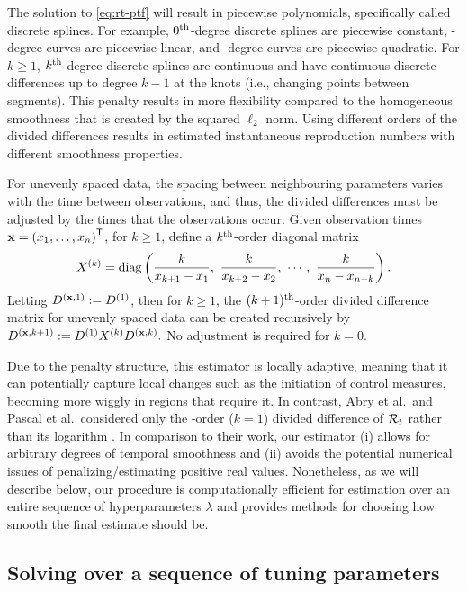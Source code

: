 The solution to \eqref{eq:rt-ptf} will result in piecewise
polynomials, specifically called discrete splines. For example, $0^{\textnormal{th}}$-degree
discrete splines are piecewise constant, \first-degree curves are piecewise
linear, and \second-degree curves are piecewise quadratic. For $k\geq 1$,
$k^{\textnormal{th}}$-degree discrete splines are continuous and have continuous discrete
differences up to degree $k-1$ at the knots (i.e., changing points between segments). This penalty results in more
flexibility compared to the homogeneous smoothness that is created by the
squared $\ell_2$ norm. Using different orders of the divided differences results in
estimated instantaneous reproduction numbers with different smoothness properties. 



For unevenly spaced data, the spacing between neighbouring parameters
varies with the time between observations, and thus, the divided differences
must be adjusted by the times that the observations occur. Given observation
times $\mathbf{x} = {(x_1,\dots,x_n)}^{\mathsf{T}}$, for $k \geq 1$, define a $k^{\textnormal{th}}$-order
diagonal matrix 
\begin{equation}
  X^{(k)} = \diag \lr{\frac{k}{x_{k+1} - x_1},\ \frac{k}{x_{k+2} - x_2},\ 
  \cdots,\ \frac{k}{x_n - x_{n-k}} }.
\end{equation}
Letting $D^{(\mathbf{x},1)} := D^{(1)}$,
then for $k\geq 1$, the $(k+1)^{\textnormal{th}}$-order divided difference matrix for unevenly
spaced data can be created recursively by
$D^{(\mathbf{x}, k+1)} := D^{(1)} X^{(k)} D^{(\mathbf{x},k)}.$ No adjustment is required
for $k=0$. 


Due to the penalty structure, this estimator is locally adaptive, meaning that
it can potentially capture local changes such as the initiation of control
measures, becoming more wiggly in regions that require it. In contrast, Abry et
al.\ and Pascal et al.\ considered only the \second-order ($k = 1$) divided
difference of $\mathcal{R}_t$ rather than its logarithm
\citep{abry2020spatial,pascal2022nonsmooth}. In comparison to their work, our
estimator (i) allows for arbitrary degrees of temporal smoothness and (ii)
avoids the potential numerical issues of penalizing/estimating positive real
values. Nonetheless, as we will describe below, our procedure is computationally
efficient for estimation over an entire sequence of hyperparameters $\lambda$
and provides methods for choosing how smooth the final estimate should be.


\subsection{Solving over a sequence of tuning parameters}
\label{sec:candidate-set}


